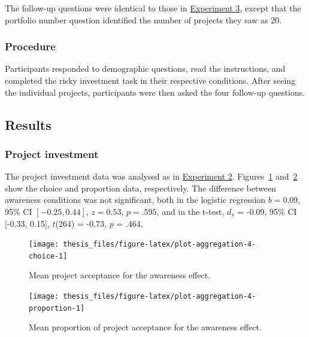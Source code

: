 \documentclass[a4paper, nobind, dvipsnames]{templates/ociamthesis}
\theoremstyle{definition}
\theoremstyle{definition}
\theoremstyle{definition}
\theoremstyle{definition}
\theoremstyle{remark}
\begin{document}
The follow-up questions were identical to those in
\protect\hyperlink{follow-up-aggregation-3}{Experiment 3}, except that the portfolio number
question identified the number of projects they saw as 20.

\hypertarget{procedure-7}{%
\subsubsection{Procedure}\label{procedure-7}}

Participants responded to demographic questions, read the instructions, and
completed the risky investment task in their respective conditions. After seeing
the individual projects, participants were then asked the four follow-up
questions.

\hypertarget{results-5}{%
\subsection{Results}\label{results-5}}

\hypertarget{project-investment-2}{%
\subsubsection{Project investment}\label{project-investment-2}}

The project investment data was analysed as in
\protect\hyperlink{results-aggregation-2}{Experiment 2}.
Figures~\ref{fig:plot-aggregation-4-choice}
and~\ref{fig:plot-aggregation-4-proportion} show the choice and proportion
data, respectively. The difference between
awareness conditions was not significant, both in the logistic regression
\(b = 0.09\), 95\% CI \([-0.25, 0.44]\), \(z = 0.53\), \(p = .595\), and in the t-test,
\(d_s\) = -0.09, 95\% CI {[}-0.33, 0.15{]}, \(t\)(264) = -0.73, \(p\) = .464.



\begin{figure}
\texttt{[image: thesis\_files/figure-latex/plot-aggregation-4-choice-1]} \caption{Mean project acceptance for the awareness effect.}\label{fig:plot-aggregation-4-choice}
\end{figure}



\begin{figure}
\texttt{[image: thesis\_files/figure-latex/plot-aggregation-4-proportion-1]} \caption{Mean proportion of project acceptance for the awareness effect.}\label{fig:plot-aggregation-4-proportion}
\end{figure}
\end{document}

